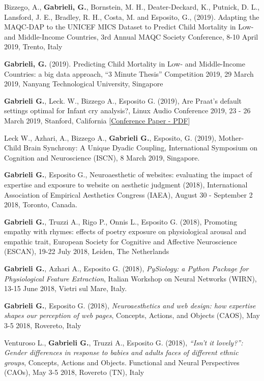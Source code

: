 \documentclass[a4paper]{deedy-resume} %
\begin{document}
\begin{minipage}[t]{0.63\textwidth}
	\sectionspace %
	\begin{tightitemize}
	    \item Bizzego, A., \textbf{Gabrieli, G.}, Bornstein, M. H., Deater-Deckard, K., Putnick, D. L., Lansford, J. E., Bradley, R. H., Costa, M. and Esposito, G., (2019). Adapting the MAQC-DAP to the UNICEF MICS Dataset to Predict Child Mortality in Low- and Middle-Income Countries, 3rd Annual MAQC Society Conference, 8-10 April 2019, Trento, Italy
	    \item \textbf{Gabrieli, G.} (2019). Predicting Child Mortality in Low- and Middle-Income Countries: a big data approach, “3 Minute Thesis” Competition 2019, 29 March 2019, Nanyang Technological University, Singapore
	    \item \textbf{Gabrieli G.}, Leck. W., Bizzego A., Esposito G. (2019), Are Praat's default settings optimal for Infant cry analysis?, Linux Audio Conference 2019, 23 - 26 March 2019, Stanford, California 	        [\href{http://lac.linuxaudio.org/2019/doc/gabrieli.pdf}{Conference Paper - PDF}]
	    \item Leck W., Azhari, A., Bizzego A., \textbf{Gabrieli G.}, Esposito, G. (2019), Mother-Child Brain Synchrony: A Unique Dyadic Coupling, International Symposium on Cognition and Neuroscience (ISCN), 8 March 2019, Singapore.
		\item \textbf{Gabrieli G.}, Esposito G., Neuroaesthetic of websites: evaluating the impact of expertise and exposure to website on aesthetic judgment (2018), International Association of Empirical Aesthetics Congress (IAEA), August 30 - September 2 2018, Toronto, Canada.
		\item \textbf{Gabrieli G.}, Truzzi A., Rigo P., Onnis L., Esposito G. (2018), Promoting empathy with rhymes: effects of poetry exposure on physiological arousal and empathic trait, European Society for Cognitive and Affective Neuroscience (ESCAN), 19-22 July 2018, Leiden, The Netherlands
		\item \textbf{Gabrieli G.}, Azhari A., Esposito G. (2018), \textit{PySiology: a Python Package for Physiological Feature Extraction}, Italian Workshop on Neural Networks (WIRN), 13-15 June 2018, Vietri sul Mare, Italy.
		\item \textbf{Gabrieli G.}, Esposito G. (2018), \textit{Neuroaesthetics and web design: how expertise shapes our perception of web pages}, Concepts, Actions, and Objects (CAOS), May  3-5 2018, Rovereto, Italy 
		\item Venturoso L., \textbf{Gabrieli G.}, Truzzi A., Esposito G. (2018), \textit{“Isn’t it lovely?”: Gender differences in response to babies and adults faces of different ethnic groups}, Concepts, Actions and Objects. Functional and Neural Perspectives (CAOs), May 3-5 2018, Rovereto (TN), Italy
				

\end{tightitemize}
\end{minipage}
\end{document}
